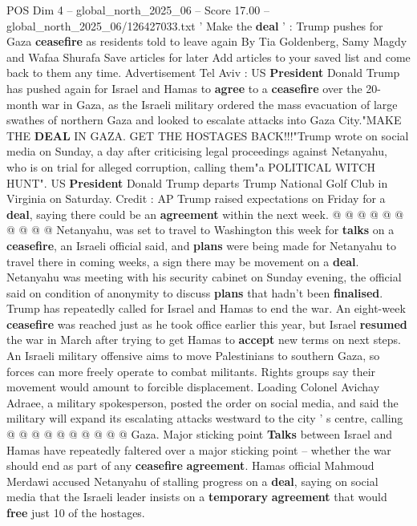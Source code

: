 \begin{textsample}{POS Dim 4 – global\_north\_2025\_06 – Score 17.00 – global\_north\_2025\_06/126427033.txt}  \label{ex:f4_pos_387}
' Make the \textbf{deal} ' : Trump pushes for Gaza \textbf{ceasefire} as residents told to leave again By Tia Goldenberg, Samy Magdy and Wafaa Shurafa Save articles for later Add articles to your saved list and come back to them any time.
Advertisement Tel Aviv : US \textbf{President} Donald Trump has pushed again for Israel and Hamas to \textbf{agree} to a \textbf{ceasefire} over the 20-month war in Gaza, as the Israeli military ordered the mass evacuation of large swathes of northern Gaza and looked to escalate attacks into Gaza City."MAKE THE \textbf{DEAL} IN GAZA.
GET THE HOSTAGES BACK!!!"Trump wrote on social media on Sunday, a day after criticising legal proceedings against Netanyahu, who is on trial for alleged corruption, calling them"a POLITICAL WITCH HUNT".
US \textbf{President} Donald Trump departs Trump National Golf Club in Virginia on Saturday.
Credit : AP Trump raised expectations on Friday for a \textbf{deal}, saying there could be an \textbf{agreement} within the next week. @ @ @ @ @ @ @ @ @ @ Netanyahu, was set to travel to Washington this week for \textbf{talks} on a \textbf{ceasefire}, an Israeli official said, and \textbf{plans} were being made for Netanyahu to travel there in coming weeks, a sign there may be movement on a \textbf{deal}.
Netanyahu was meeting with his security cabinet on Sunday evening, the official said on condition of anonymity to discuss \textbf{plans} that hadn't been \textbf{finalised}.
Trump has repeatedly called for Israel and Hamas to end the war.
An eight-week \textbf{ceasefire} was reached just as he took office earlier this year, but Israel \textbf{resumed} the war in March after trying to get Hamas to \textbf{accept} new terms on next steps.
An Israeli military offensive aims to move Palestinians to southern Gaza, so forces can more freely operate to combat militants.
Rights groups say their movement would amount to forcible displacement.
Loading Colonel Avichay Adraee, a military spokesperson, posted the order on social media, and said the military will expand its escalating attacks westward to the city ' s centre, calling @ @ @ @ @ @ @ @ @ @ Gaza.
Major sticking point \textbf{Talks} between Israel and Hamas have repeatedly faltered over a major sticking point -- whether the war should end as part of any \textbf{ceasefire} \textbf{agreement}.
Hamas official Mahmoud Merdawi accused Netanyahu of stalling progress on a \textbf{deal}, saying on social media that the Israeli leader insists on a \textbf{temporary} \textbf{agreement} that would \textbf{free} just 10 of the hostages.

\end{textsample}
